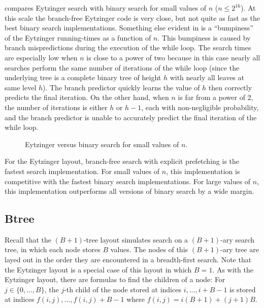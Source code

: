 \documentclass{patmorin}
\begin{document}
 compares Eytzinger search with binary search for
small values of $n$ ($n\le 2^{16}$).  At this scale
the branch-free Eytzinger code is very close, but not quite as fast
as the best binary search implementations.  Something else evident in
 is a ``bumpiness'' of the Eytzinger running-times
as a function of $n$.  This bumpiness is caused by branch mispredictions
during the execution of the while loop.  The search times are especially
low when $n$ is close to a power of two because in this case nearly all
searches perform the same number of iterations of the while loop (since
the underlying tree is a complete binary tree of height $h$ with nearly
all leaves at same level $h$).  The branch predictor quickly learns
the value of $h$ then correctly predicts the final iteration.  On the
other hand, when $n$ is far from a power of 2, the number of iterations
is either $h$ or $h-1$, each with non-negligible probability, and the
branch predictor is unable to accurately predict the final iteration of
the while loop.

\begin{figure}
   \caption{Eytzinger versus binary search for small values of $n$.}
\end{figure}



\begin{lesson}
  For the Eytzinger layout, branch-free search with explicit prefetching
  is the fastest search implementation. For small values of $n$,
  this implementation is competitive with the fastest binary search
  implementations. For large values of $n$, this implementation
  outperforms all versions of binary search by a wide margin.
\end{lesson}

\subsection{Btree}

Recall that the $(B+1)$-tree layout simulates search on a $(B+1)$-ary
search tree, in which each node stores $B$ values.  The nodes of this
$(B+1)$-ary tree are layed out in the order they are encountered in
a breadth-first search.  Note that the Eytzinger layout is a special
case of this layout in which $B=1$. As with the Eytzinger layout, there
are formulas to find the children of a node: For $j\in\{0,\ldots,B\}$, the
$j$-th child of the node stored at indices $i,\ldots,i+B-1$ is stored
at indices $f(i,j),\ldots,f(i,j)+B-1$ where $f(i,j)=i(B+1)+(j+1)B$.
\end{document}
